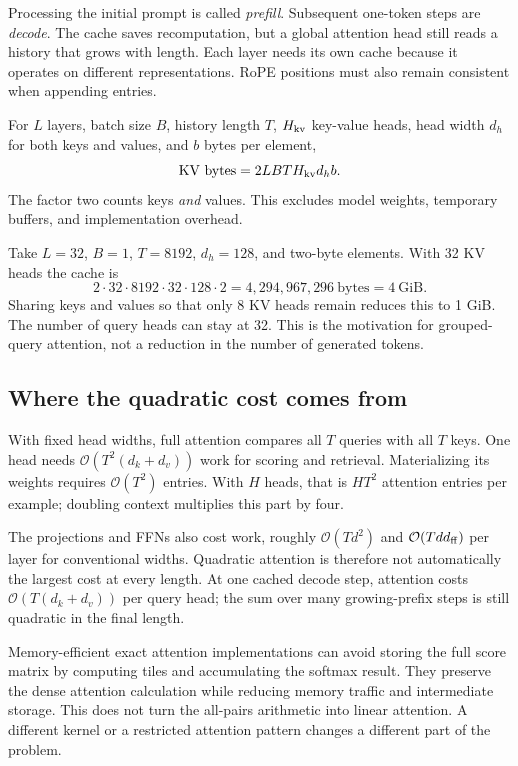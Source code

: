 \documentclass[11pt, oneside]{book}
\newcommand{\bigO}[1]{\mathcal{O}\!\left(#1\right)}
\let\originalsubsection\subsection
\renewcommand{\subsection}{\Needspace{6\baselineskip}\originalsubsection}
\begin{document}
Processing the initial prompt is called \emph{prefill}. Subsequent one-token steps are \emph{decode}. The cache saves recomputation, but a global attention head still reads a history that grows with length. Each layer needs its own cache because it operates on different representations. RoPE positions must also remain consistent when appending entries.

For $L$ layers, batch size $B$, history length $T$, $H_{\rm kv}$ key-value heads, head width $d_h$ for both keys and values, and $b$ bytes per element,
\[
 \text{KV bytes}=2LBT H_{\rm kv}d_h b.
\]
The factor two counts keys \emph{and} values. This excludes model weights, temporary buffers, and implementation overhead.

\begin{exbox}[title={The cache can be surprisingly large}]
Take $L=32$, $B=1$, $T=8192$, $d_h=128$, and two-byte elements. With 32 KV heads the cache is
\[
 2\cdot32\cdot8192\cdot32\cdot128\cdot2
 =4{,}294{,}967{,}296\ \text{bytes}=4\ \text{GiB}.
\]
Sharing keys and values so that only 8 KV heads remain reduces this to 1 GiB. The number of query heads can stay at 32. This is the motivation for grouped-query attention, not a reduction in the number of generated tokens.
\end{exbox}

\subsection*{Where the quadratic cost comes from}
With fixed head widths, full attention compares all $T$ queries with all $T$ keys. One head needs $\bigO{T^2(d_k+d_v)}$ work for scoring and retrieval. Materializing its weights requires $\bigO{T^2}$ entries. With $H$ heads, that is $HT^2$ attention entries per example; doubling context multiplies this part by four.

The projections and FFNs also cost work, roughly $\bigO{Td^2}$ and $\bigO{Tdd_{\rm ff}}$ per layer for conventional widths. Quadratic attention is therefore not automatically the largest cost at every length. At one cached decode step, attention costs $\bigO{T(d_k+d_v)}$ per query head; the sum over many growing-prefix steps is still quadratic in the final length.

Memory-efficient exact attention implementations can avoid storing the full score matrix by computing tiles and accumulating the softmax result. They preserve the dense attention calculation while reducing memory traffic and intermediate storage. This does not turn the all-pairs arithmetic into linear attention. A different kernel or a restricted attention pattern changes a different part of the problem.
\end{document}
